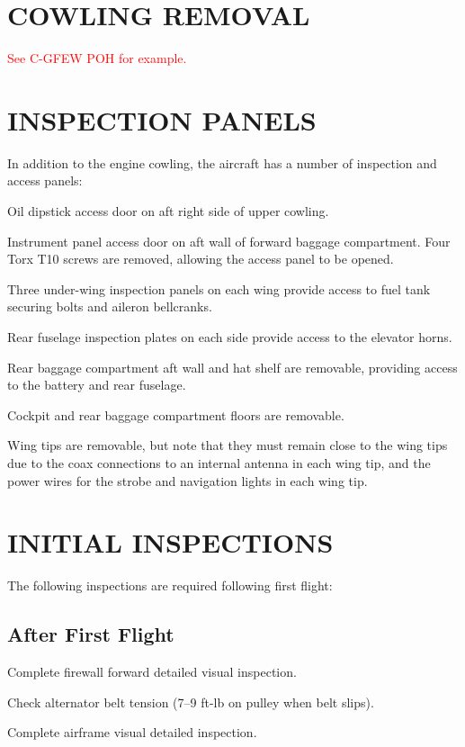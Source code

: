 \section{COWLING REMOVAL} \textcolor{red}{See C-GFEW POH for example.}

\section{INSPECTION PANELS}
In addition to the engine cowling, the aircraft has a number of inspection and access panels:
\begin{enumerate*}
  \item Oil dipstick access door on aft right side of upper cowling.
  \item Instrument panel access door on aft wall of forward baggage compartment.  Four Torx T10 screws are removed, allowing the access panel to be opened.
  \item Three under-wing inspection panels on each wing provide access to fuel tank securing bolts and aileron bellcranks.
  \item Rear fuselage inspection plates on each side provide access to the elevator horns.
  \item Rear baggage compartment aft wall and hat shelf are removable, providing access to the battery and rear fuselage.
  \item Cockpit and rear baggage compartment floors are removable.
  \item Wing tips are removable, but note that they must remain close to the wing tips due to the coax connections to an internal antenna in each wing tip, and the power wires for the strobe and navigation lights in each wing tip.
  \end{enumerate*}


\section{INITIAL INSPECTIONS}

The following inspections are required following first flight:

\subsection{After First Flight} 
\begin{enumerate*}
	\item Complete firewall forward detailed visual inspection. 
	\item Check alternator belt tension (7--9 ft-lb on pulley when belt slips). 
	\item Complete airframe visual detailed inspection. 
\end{enumerate*}

